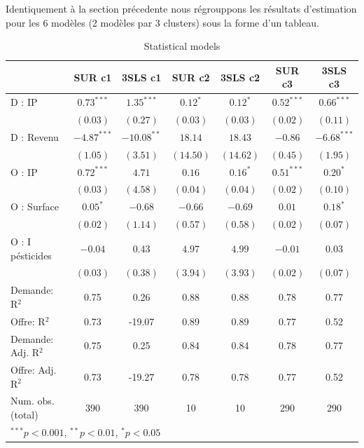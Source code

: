 \documentclass[11pt,]{article}
\begin{document}
Identiquement à la section précedente nous régrouppons les résultats
d'estimation pour les 6 modèles (2 modèles par 3 clusters) sous la forme
d'un tableau.

\FloatBarrier

\begin{table}[!htbp]
\begin{center}
\begin{tabular}{l c c c c c c }
\hline
 & SUR c1 & 3SLS c1 & SUR c2 & 3SLS c2 & SUR c3 & 3SLS c3 \\
\hline
D : IP              & $0.73^{***}$  & $1.35^{***}$  & $0.12^{*}$ & $0.12^{*}$ & $0.52^{***}$ & $0.66^{***}$  \\
                    & $(0.03)$      & $(0.27)$      & $(0.03)$   & $(0.03)$   & $(0.02)$     & $(0.11)$      \\
D : Revenu          & $-4.87^{***}$ & $-10.08^{**}$ & $18.14$    & $18.43$    & $-0.86$      & $-6.68^{***}$ \\
                    & $(1.05)$      & $(3.51)$      & $(14.50)$  & $(14.62)$  & $(0.45)$     & $(1.95)$      \\
O : IP              & $0.72^{***}$  & $4.71$        & $0.16$     & $0.16^{*}$ & $0.51^{***}$ & $0.20^{*}$    \\
                    & $(0.03)$      & $(4.58)$      & $(0.04)$   & $(0.04)$   & $(0.02)$     & $(0.10)$      \\
O : Surface         & $0.05^{*}$    & $-0.68$       & $-0.66$    & $-0.69$    & $0.01$       & $0.18^{*}$    \\
                    & $(0.02)$      & $(1.14)$      & $(0.57)$   & $(0.58)$   & $(0.02)$     & $(0.07)$      \\
O : I pésticides    & $-0.04$       & $0.43$        & $4.97$     & $4.99$     & $-0.01$      & $0.03$        \\
                    & $(0.03)$      & $(0.38)$      & $(3.94)$   & $(3.93)$   & $(0.02)$     & $(0.07)$      \\
\hline
Demande: R$^2$      & 0.75          & 0.26          & 0.88       & 0.88       & 0.78         & 0.77          \\
Offre: R$^2$        & 0.73          & -19.07        & 0.89       & 0.89       & 0.77         & 0.52          \\
Demande: Adj. R$^2$ & 0.75          & 0.25          & 0.84       & 0.84       & 0.78         & 0.77          \\
Offre: Adj. R$^2$   & 0.73          & -19.27        & 0.78       & 0.78       & 0.77         & 0.52          \\
Num. obs. (total)   & 390           & 390           & 10         & 10         & 290          & 290           \\
\hline
\multicolumn{7}{l}{\scriptsize{$^{***}p<0.001$, $^{**}p<0.01$, $^*p<0.05$}}
\end{tabular}
\caption{Statistical models}
\label{table : sur et 3sls clusters}
\end{center}
\end{table}
\end{document}
